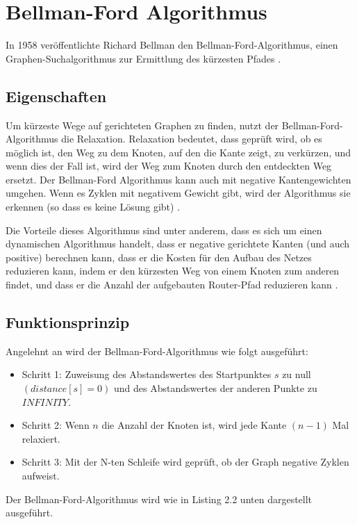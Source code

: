 \section{Bellman-Ford Algorithmus}
\label{Bellman-Ford-Algorithmus}

In 1958 veröffentlichte Richard Bellman den Bellman-Ford-Algorithmus, einen Graphen-Suchalgorithmus zur Ermittlung des kürzesten 
Pfades \cite{Abusalim2020,Sulaiman18}.
\subsection{Eigenschaften}
Um kürzeste Wege auf gerichteten Graphen zu finden, nutzt der Bellman-Ford-Algorithmus die Relaxation.
Relaxation bedeutet, dass geprüft wird, ob es möglich ist, den Weg zu dem Knoten, auf den die Kante zeigt, zu verkürzen, 
und wenn dies der Fall ist, wird der Weg zum Knoten durch den entdeckten Weg ersetzt.
Der Bellman-Ford Algorithmus kann auch mit negative Kantengewichten umgehen. 
Wenn es Zyklen mit negativem Gewicht gibt, wird der Algorithmus sie erkennen (so dass es keine Lösung gibt) \cite{Vaibhavi2014}.

Die Vorteile dieses Algorithmus sind unter anderem, dass es sich um einen dynamischen Algorithmus handelt, dass er negative gerichtete 
Kanten (und auch positive) berechnen kann, dass er die Kosten für den Aufbau des Netzes reduzieren kann, indem er den kürzesten Weg von einem 
Knoten zum anderen findet, und dass er die Anzahl der aufgebauten Router-Pfad reduzieren kann \cite{Abusalim2020}.

\subsection{Funktionsprinzip}

Angelehnt an \cite{Abusalim2020} wird der Bellman-Ford-Algorithmus wie folgt ausgeführt:
\\
\begin{itemize}
	\item Schritt 1: Zuweisung des Abstandswertes des Startpunktes $s$ zu null $(distance[s] = 0)$ und des Abstandswertes der anderen Punkte zu 
		$INFINITY$.
	\item Schritt 2: Wenn $n$ die Anzahl der Knoten ist, wird jede Kante $(n - 1)$ Mal relaxiert. 
	\item Schritt 3: Mit der N-ten Schleife wird geprüft, ob der Graph negative Zyklen aufweist.
\end{itemize}
Der Bellman-Ford-Algorithmus wird wie in Listing 2.2 unten dargestellt ausgeführt.

